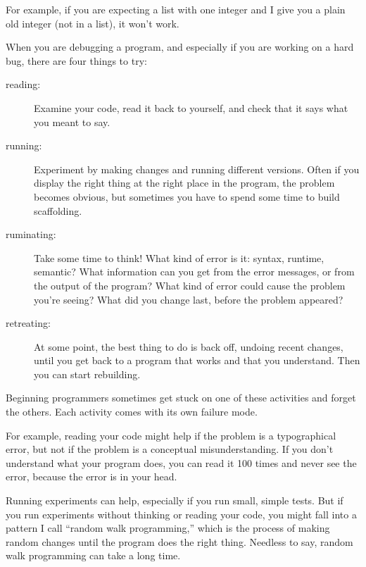 \documentclass[10pt]{book}
\begin{document}
For example, if you are expecting a list with one integer and I
give you a plain old integer (not in a list), it won't work.

When you are debugging a program, and especially if you are
working on a hard bug, there are four things to try:

\begin{description}

\item[reading:] Examine your code, read it back to yourself, and
check that it says what you meant to say.

\item[running:] Experiment by making changes and running different
versions.  Often if you display the right thing at the right place
in the program, the problem becomes obvious, but sometimes you have to
spend some time to build scaffolding.

\item[ruminating:] Take some time to think!  What kind of error
is it: syntax, runtime, semantic?  What information can you get from
the error messages, or from the output of the program?  What kind of
error could cause the problem you're seeing?  What did you change
last, before the problem appeared?

\item[retreating:] At some point, the best thing to do is back
off, undoing recent changes, until you get back to a program that
works and that you understand.  Then you can start rebuilding.

\end{description}

Beginning programmers sometimes get stuck on one of these activities
and forget the others.  Each activity comes with its own failure
mode.


For example, reading your code might help if the problem is a
typographical error, but not if the problem is a conceptual
misunderstanding.  If you don't understand what your program does, you
can read it 100 times and never see the error, because the error is in
your head.


Running experiments can help, especially if you run small, simple
tests.  But if you run experiments without thinking or reading your
code, you might fall into a pattern I call ``random walk programming,''
which is the process of making random changes until the program
does the right thing.  Needless to say, random walk programming
can take a long time.
\end{document}
